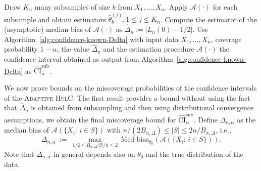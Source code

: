 \documentclass{article}
\newcommand{\ahulcnospace}{\textsc{Adaptive HulC}}
\numberwithin{myalgctr}{section}
\begin{document}
\begin{algorithm}[t]
    \caption{Adaptive Confidence Interval with Unknown Median Bias (\ahulcnospace)}
    \label{alg:confidence-unknown-Delta}
    \SetAlgoLined
    \SetEndCharOfAlgoLine{}
    Draw $K_n$ many subsamples of size $b$ from $X_1, \ldots, X_n$. Apply $\mathcal{A}(\cdot)$ for each subsample and obtain estimators $\widehat{\theta}_b^{(j)}, 1\le j\le K_n$.\;
    Compute the estimator of the (asymptotic) median bias of $\mathcal{A}(\cdot)$ as 
	$\widehat{\Delta}_n := |L_n(0) - {1}/{2}|.$\;
	Use Algorithm~\ref{alg:confidence-known-Delta} with input data $X_1, \ldots, X_n$, coverage probability $1 - \alpha$, the value $\widehat{\Delta}_n$ and the estimation procedure $\mathcal{A}(\cdot)$\;
	\Return the confidence interval obtained as output from Algorithm~\ref{alg:confidence-known-Delta} as $\widehat{\mathrm{CI}}_{\alpha}^{\mathrm{sub}}$.
\end{algorithm}
We now prove bounds on the miscoverage probabilities of the confidence intervals of the \ahulcnospace. The first result provides a bound without using the fact that $\widehat{\Delta}_n$ is obtained from subsampling and then using distributional convergence assumptions, we obtain the final miscoverage bound for $\widehat{\mathrm{CI}}_{\alpha}^{\mathrm{sub}}$. Define ${\Delta}_{n,\alpha}$ as the median bias of $\mathcal{A}(\{X_i:\,i\in S\})$ with ${n}/{(2B_{\alpha,\Delta})}\le |S| \le 2n/B_{\alpha,\Delta}$, i.e.,
\[
{\Delta}_{n,\alpha} ~:=~ \max_{1/2 \le B_{\alpha,\Delta}|S|/n \le 2}\,\mbox{Med-bias}_{\theta_0}(\mathcal{A}(\{X_i:\,i\in S\})).
\]
{\color{black}Note that $\Delta_{n,\alpha}$ in general depends also on $\theta_0$ and the true distribution of the data.}
\end{document}
